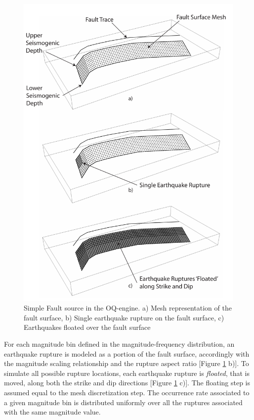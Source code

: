 \begin{figure}
\centering
\includegraphics[width=14cm]{./Pictures/SimpleFaultSource.pdf}
\caption{Simple Fault source in the OQ-engine. a) Mesh representation of the fault surface, b) Single earthquake rupture on the fault surface, c) Earthquakes floated over the fault surface}
\label{fig:SimpleFaultSource}
\end{figure}
For each magnitude bin defined in the magnitude-frequency distribution, an earthquake rupture is modeled as a portion of the fault surface, accordingly with the magnitude scaling relationship and the rupture aspect
ratio [Figure \ref{fig:SimpleFaultSource} b)]. To simulate all possible rupture locations, each earthquake rupture is \textit{floated}, that is moved, along both the strike and dip directions [Figure
\ref{fig:SimpleFaultSource} c)]. The floating step is assumed equal to the mesh discretization step.
The occurrence rate associated to a given magnitude bin is distributed uniformly over all the ruptures associated with the same magnitude value.
